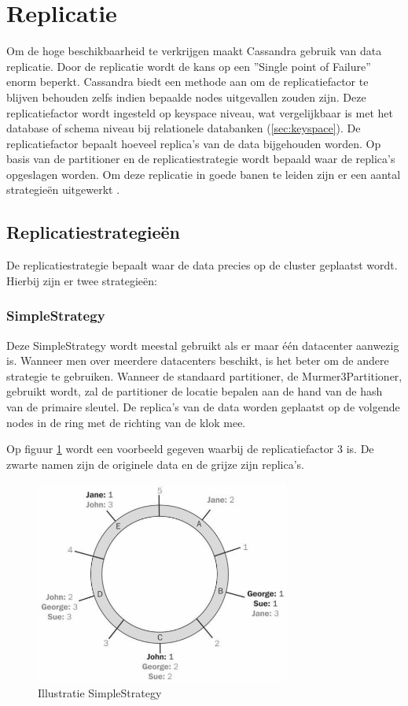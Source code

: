\section{Replicatie}
\label{sec_replication}
Om de hoge beschikbaarheid te verkrijgen maakt Cassandra gebruik van data replicatie.
Door de replicatie wordt de kans op een ''Single point of Failure'' enorm beperkt.
Cassandra biedt een methode aan om de replicatiefactor te blijven behouden zelfs indien bepaalde nodes uitgevallen zouden zijn.
Deze replicatiefactor wordt ingesteld op keyspace niveau, wat vergelijkbaar is met het database of schema niveau bij relationele databanken (\ref{sec:keyspace}).
De replicatiefactor bepaalt hoeveel replica's van de data bijgehouden worden.
Op basis van de partitioner en de replicatiestrategie wordt  bepaald waar de replica's opgeslagen worden.
Om deze replicatie in goede banen te leiden zijn er een aantal strategieën uitgewerkt \citep{kan2014cassandra}.

\subsection{Replicatiestrategieën}
De replicatiestrategie bepaalt waar de data precies op de cluster geplaatst wordt.
Hierbij zijn er twee strategieën:

\subsubsection{SimpleStrategy}
Deze SimpleStrategy wordt meestal gebruikt als er maar één datacenter aanwezig is.
Wanneer men over meerdere datacenters beschikt, is het beter om de andere strategie te gebruiken.
Wanneer de standaard partitioner, de Murmer3Partitioner, gebruikt wordt, zal de partitioner de locatie bepalen aan de hand van de hash van de primaire sleutel.
De replica's van de data worden geplaatst op de volgende nodes in de ring met de richting van de klok mee.
	
Op figuur \ref{fig:simple_strategy} wordt een voorbeeld gegeven waarbij de replicatiefactor 3 is.
De zwarte namen zijn de originele data en de grijze zijn replica's.
	
\begin{figure}[H]
	\centering
	\includegraphics[width=0.75\textwidth]{img/4_architectuur/SimpleStrategy}
	\caption{Illustratie SimpleStrategy \citep{strickland2014availability}}
	\label{fig:simple_strategy}
\end{figure}
	
